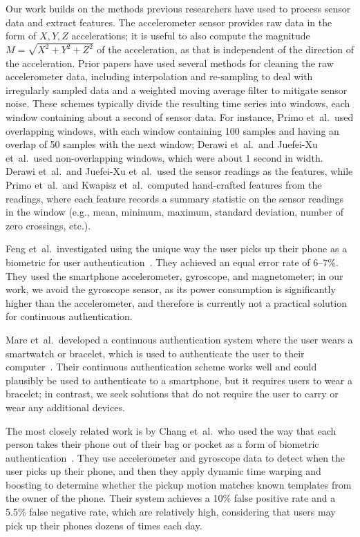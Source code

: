 Our work builds on the methods previous researchers have used to process sensor data and extract features.
The accelerometer sensor provides raw data in the form of $X,Y,Z$ accelerations; it is useful to also compute the magnitude $M=\sqrt{X^2+Y^2+Z^2}$ of the acceleration, as that is independent of the direction of the acceleration.
Prior papers have used several methods for cleaning the raw accelerometer data, including interpolation and re-sampling to deal with irregularly sampled data and a weighted moving average filter to mitigate sensor noise.
These schemes typically divide the resulting time series into windows, each window containing about a second of sensor data.
For instance, Primo et~al.\ used overlapping windows, with each window containing 100 samples and having an overlap of 50 samples with the next window; Derawi et~al.\ and Juefei-Xu et~al.\ used non-overlapping windows, which were about 1 second in width.
Derawi et~al.\ and Juefei-Xu et~al.\ used the sensor readings as the features, while Primo et~al.\ and Kwapisz et~al.\ computed hand-crafted features from the readings, where each feature records a summary statistic on the sensor readings in the window (e.g., mean, minimum, maximum, standard deviation, number of zero crossings, etc.).

Feng et~al.\ investigated using the unique way the user picks up their phone as a biometric for user authentication~\cite{feng:pickup}. 
They achieved an equal error rate of 6--7\%.
They used the smartphone accelerometer, gyroscope, and magnetometer; in our work, we avoid the gyroscope sensor, as its power consumption is significantly higher than the accelerometer, and therefore is currently not a practical solution for continuous authentication.

Mare et~al.\ developed a continuous authentication system where the user wears a smartwatch or bracelet, which is used to authenticate the user to their computer~\cite{mare:zebra}. 
Their continuous authentication scheme works well and could plausibly be used to authenticate to a smartphone, but it requires users to wear a bracelet; in contrast, we seek solutions that do not require the user to carry or wear any additional devices.

The most closely related work is by Chang et~al.\, who used the way
that each person takes their phone out of their bag or pocket as a 
form of biometric authentication~\cite{cheng:theft}.
They use accelerometer and gyroscope data to detect when the user picks
up their phone, and then they apply dynamic time warping and boosting to
determine whether the pickup motion matches known templates from the
owner of the phone.
Their system achieves a 10\% false positive rate and a 5.5\% false negative rate, which are relatively high,
considering that users may pick up their phones dozens of times each day.

